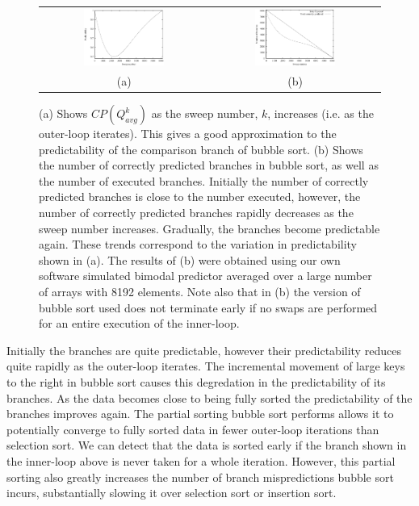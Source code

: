 \documentclass[acmtocl]{acmtrans2m}
\begin{document}
\begin{figure}
\centering
\begin{tabular}{cc}
\includegraphics[width=0.5\textwidth]{plots/bubble_predictability.eps} & \includegraphics[width=0.5\textwidth]{plots/bubble_sweep_misses.eps} \\
(a) & (b) \\
\end{tabular}
\caption{(a) Shows $CP(Q^k_{avg})$ as the sweep number, $k$, increases (i.e. as
the outer-loop iterates). This gives a good approximation to the predictability
of the comparison branch of bubble sort. (b) Shows the number of correctly
predicted branches in bubble sort, as well as the number of executed branches.
Initially the number of correctly predicted branches is close to the number
executed, however, the number of correctly predicted branches rapidly decreases
as the sweep number increases. Gradually, the branches become predictable again.
These trends correspond to the variation in predictability shown in (a). The
results of (b) were obtained using our own software simulated bimodal predictor
averaged over a large number of arrays with 8192 elements. Note also that in (b)
the version of bubble sort used does not terminate early if no swaps are
performed for an entire execution of the inner-loop.  }
\label{bubble_predictability}
\end{figure}

Initially the branches are quite predictable, however their predictability
reduces quite rapidly as the outer-loop iterates.  The incremental movement of
large keys to the right in bubble sort causes this degredation in the
predictability of its branches. As the data becomes close to being fully sorted
the predictability of the branches improves again. The partial sorting bubble
sort performs allows it to potentially converge to fully sorted data in fewer
outer-loop iterations than selection sort. We can detect that the data is sorted
early if the branch shown in the inner-loop above is never taken for a whole
iteration. However, this partial sorting also greatly increases the number of
branch mispredictions bubble sort incurs, substantially slowing it over
selection sort or insertion sort.
\end{document}
